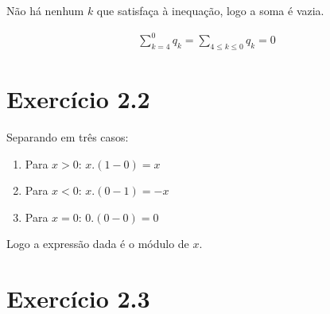 \documentclass[10pt]{book}
\begin{document}
Não há nenhum $k$ que satisfaça à inequação, logo a soma é vazia.

\begin{align*}
\sum_{k=4}^0 q_k = \sum_{4\leq k \leq 0} q_k = 0
\end{align*}

\section{Exercício 2.2}

Separando em três casos:

\begin{enumerate}
\item Para $x>0$: $x.(1 - 0) = x$

\item Para $x<0$: $x.(0 - 1) = -x$

\item Para $x=0$: $0.(0-0) = 0$
\end{enumerate}

Logo a expressão dada é o módulo de $x$.

\section{Exercício 2.3}

\begin{enumerate}

\item $\sum_


\end{enumerate}
\end{document}
